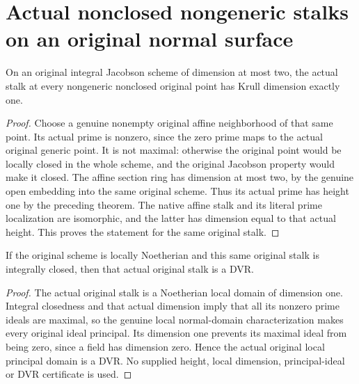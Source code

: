 \section{Actual nonclosed nongeneric stalks on an original normal surface}
\begin{theorem}\label{thm:normal-surface-original-stalk-dimension}
On an original integral Jacobson scheme of dimension at most two, the actual stalk at every nongeneric nonclosed original point has Krull dimension exactly one.
\leanok
\end{theorem}
\begin{proof}
Choose a genuine nonempty original affine neighborhood of that same point. Its actual prime is nonzero, since the zero prime maps to the actual original generic point. It is not maximal: otherwise the original point would be locally closed in the whole scheme, and the original Jacobson property would make it closed. The affine section ring has dimension at most two, by the genuine open embedding into the same original scheme. Thus its actual prime has height one by the preceding theorem. The native affine stalk and its literal prime localization are isomorphic, and the latter has dimension equal to that actual height. This proves the statement for the same original stalk.
\end{proof}
\begin{theorem}\label{thm:normal-surface-original-stalk-dvr}
If the original scheme is locally Noetherian and this same original stalk is integrally closed, then that actual original stalk is a DVR.
\leanok
\end{theorem}
\begin{proof}
The actual original stalk is a Noetherian local domain of dimension one. Integral closedness and that actual dimension imply that all its nonzero prime ideals are maximal, so the genuine local normal-domain characterization makes every original ideal principal. Its dimension one prevents its maximal ideal from being zero, since a field has dimension zero. Hence the actual original local principal domain is a DVR. No supplied height, local dimension, principal-ideal or DVR certificate is used.
\end{proof}
